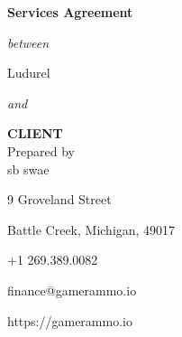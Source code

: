 \documentclass[usletter,11pt]{article} %
\begin{document}
\vspace*{\fill} %

\begin{center}

{\huge \textbf{Services Agreement}}

\small\textit{{between}}

{\Large Ludurel}

\small\textit{{and}}

{\LARGE\textbf{CLIENT}}\\

\vspace{5ex}
Prepared by\\
\vspace{2ex}
sb swae
\vspace{2ex}

9 Groveland Street

Battle Creek, Michigan, 49017

+1 269.389.0082

finance@gamerammo.io

https://gamerammo.io

\end{center}

\vspace*{\fill} %

\newpage

\newcommand{\deliverables}{
\section{Deliverables}

\ludu agrees to deliver to the You a website consisting of the following components:

Home Page\\
Menu Page\\
Store Locater \& Info Page\\
FAQs Page\\

Per your specifications, We also agree to provide you with the following services:

Copywriting\\
Comprehensive Editing\\
Permissions Collection and Management\\
Research\\
\latex Document Typesetting and Layout

You have supplied more detailed specifications to us in writing via email. You are welcome to make any changes to the specifications for deliverables provided that You also approve any changes We may need to make to our estimate and/or retainer. Any work outside of the scope of the website (including limimted maintenance) and the services mentioned above will be subject to a separate contract.
}
\end{document}
